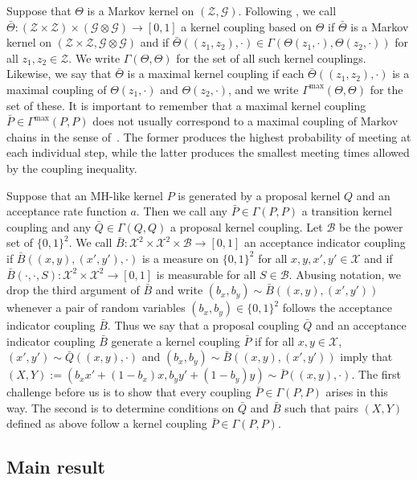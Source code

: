 \documentclass[aihp]{imsart}
\theoremstyle{plain}
\theoremstyle{remark}
\theoremstyle{definition} \newtheorem{example}{Example}
\newcommand{\scrG}{\mathscr{G}}
\newcommand{\calX}{\mathcal{X}}
\newcommand{\calZ}{\mathcal{Z}}
\newcommand{\cd}{\cdot}
\newcommand{\bp}{\bar P}
\newcommand{\bq}{\bar Q}
\newcommand{\bb}{\bar B}
\newcommand{\xy}{(x,y)}
\newcommand{\xyp}{(x',y')}
\newcommand{\Gmax}{\Gamma^\mathrm{max}}
\begin{document}
Suppose that $\Theta$ is a Markov kernel on $(\calZ,\scrG)$. Following
\citet[][chap.19]{douc2018markov}, we call $\bar \Theta : (\calZ \times \calZ) \times (\scrG \otimes
\scrG) \to [0,1]$ a kernel coupling based on $\Theta$ if $\bar \Theta$ is a Markov kernel on $(\calZ
\times \calZ, \scrG \otimes \scrG)$ and if $\bar \Theta((z_1,z_2),\cd) \in
\Gamma(\Theta(z_1,\cd),\Theta(z_2,\cd))$ for all $z_1,z_2 \in \calZ$. We write
$\Gamma(\Theta,\Theta)$ for the set of all such kernel couplings. Likewise, we say that $\bar
\Theta$ is a maximal kernel coupling if each $\bar \Theta((z_1,z_2), \cd)$ is a maximal coupling of
$\Theta(z_1,\cd)$ and $\Theta(z_2,\cd)$, and we write $\Gmax(\Theta, \Theta)$ for the set of these.
It is important to remember that a maximal kernel coupling $\bp \in \Gmax(P,P)$ does not usually
correspond to a maximal coupling of Markov chains in the sense of~\citet{aldous1983random}. The
former produces the highest probability of meeting at each individual step, while the latter
produces the smallest meeting times allowed by the coupling inequality.

Suppose that an MH-like kernel $P$ is generated by a proposal kernel $Q$ and an acceptance rate
function $a$. Then we call any $\bp \in \Gamma(P,P)$ a transition kernel coupling and any $\bq \in
\Gamma(Q,Q)$ a proposal kernel coupling. Let $\mathcal{B}$ be the power set of $\{0,1\}^2$. We call
$\bb: \calX^2 \times \calX^2 \times \mathcal{B} \to [0,1]$ an acceptance indicator coupling if
$\bb(\xy, \xyp, \cdot)$ is a measure on $\{0,1\}^2$ for all $x,y,x',y' \in \calX$ and if $\bb(\cdot,
\cdot, S): \calX^2 \times \calX^2 \to [0,1]$ is measurable for all $S \in \mathcal{B}$. Abusing
notation, we drop the third argument of $\bb$ and write $(b_x, b_y) \sim \bb(\xy, \xyp)$ whenever a
pair of random variables $(b_x, b_y) \in \{0,1\}^2$ follows the acceptance indicator coupling $\bb$.
Thus we say that a proposal coupling $\bq$ and an acceptance indicator coupling $\bb$ generate a
kernel coupling $\bp$ if for all $x,y \in \calX$, ${ \xyp \sim \bq(\xy,\cdot) }$ and ${ (b_x, b_y)
	\sim \bb(\xy, \xyp) }$ imply that $ (X,Y) := (b_x x' + (1 - b_x) x, b_y y' + (1 - b_y) y) \sim
\bp(\xy, \cdot). $ The first challenge before us is to show that every coupling $\bp \in
\Gamma(P,P)$ arises in this way. The second is to determine conditions on $\bq$ and $\bb$ such that
pairs $(X,Y)$ defined as above follow a kernel coupling $\bp \in \Gamma(P,P)$.

\subsection{Main result}
\end{document}
